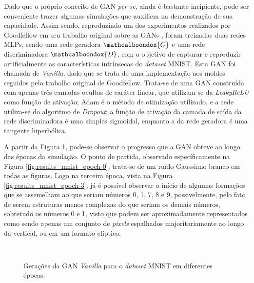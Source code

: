 Dado que o próprio conceito de GAN \textit{per se}, ainda é bastante incipiente, pode ser conveniente trazer algumas simulações que auxiliem na demonstração de sua capacidade. Assim sendo, reproduzindo um dos experimentos realizados por Goodfellow em seu trabalho original sobre as GANs \citep{NIPS2014_5423}, foram treinadas duas redes MLPs, sendo uma rede geradora $\mathcalboondox{G}$ e uma rede discriminadora $\mathcalboondox{D}$, com o objetivo de capturar e reproduzir artificialmente as características intrínsecas do \textit{dataset} MNIST. Esta GAN foi chamada de \textit{Vanilla}, dado que se trata de uma implementação aos moldes seguidos pelo trabalho original de Goodfellow. Trata-se de uma GAN construída com apenas três camadas ocultas de caráter linear, que utilizam-se da \textit{LeakyReLU} como função de ativação; Adam é o método de otimização utilizado, e a rede utiliza-se do algoritmo de \textit{Dropout}; a função de ativação da camada de saída da rede discriminadora é uma simples sigmoidal, enquanto a da rede geradora é uma tangente hiperbólica.

A partir da Figura \ref{fig:results_mnist}, pode-se observar o progresso que a GAN obteve ao longo das épocas da simulação. O ponto de partida, observado específicamente na Figura \ref{fig:results_mnist_epoch-0}, trata-se de um ruído Gaussiano branco em todas as figuras. Logo na terceira época, vista na Figura \ref{fig:results_mnist_epoch-3}, já é possível observar o início de algumas formações que se assemelham ao que seriam números 0, 1, 7, 8 e 9, possivelmente, pelo fato de serem estruturas menos complexas do que seriam os demais números, sobretudo os números 0 e 1, visto que podem ser aproximadamente representados como sendo apenas um conjunto de \textit{pixels} espalhados majoritariamente ao longo da vertical, ou em um formato elíptico.


\begin{figure}[H]
    \centering
    \hspace{0.5cm}
    \\
    \vspace{0.5cm}
    \hspace{0.5cm}
    \caption{Gerações da GAN \textit{Vanilla} para o \textit{dataset} MNIST em diferentes épocas.}
    \label{fig:results_mnist}
\end{figure}

